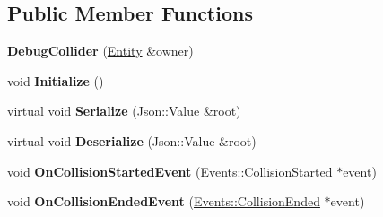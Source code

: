\subsection*{Public Member Functions}
\begin{DoxyCompactItemize}
\item 
\hypertarget{classDCEngine_1_1Components_1_1DebugCollider_a40dec5fc957f92340508b3570e513874}{{\bfseries Debug\-Collider} (\hyperlink{classDCEngine_1_1Entity}{Entity} \&owner)}\label{classDCEngine_1_1Components_1_1DebugCollider_a40dec5fc957f92340508b3570e513874}

\item 
\hypertarget{classDCEngine_1_1Components_1_1DebugCollider_ae752ba4d3b7dc2f8857536b277c9b2a2}{void {\bfseries Initialize} ()}\label{classDCEngine_1_1Components_1_1DebugCollider_ae752ba4d3b7dc2f8857536b277c9b2a2}

\item 
\hypertarget{classDCEngine_1_1Components_1_1DebugCollider_a0f5a33e7a1012393e58073505e47fdb4}{virtual void {\bfseries Serialize} (Json\-::\-Value \&root)}\label{classDCEngine_1_1Components_1_1DebugCollider_a0f5a33e7a1012393e58073505e47fdb4}

\item 
\hypertarget{classDCEngine_1_1Components_1_1DebugCollider_a6cb73edd53aa5fb98841aecf4f7f3b61}{virtual void {\bfseries Deserialize} (Json\-::\-Value \&root)}\label{classDCEngine_1_1Components_1_1DebugCollider_a6cb73edd53aa5fb98841aecf4f7f3b61}

\item 
\hypertarget{classDCEngine_1_1Components_1_1DebugCollider_af31ccceeac52e79a796fdb594336bd58}{void {\bfseries On\-Collision\-Started\-Event} (\hyperlink{classDCEngine_1_1Events_1_1CollisionStarted}{Events\-::\-Collision\-Started} $\ast$event)}\label{classDCEngine_1_1Components_1_1DebugCollider_af31ccceeac52e79a796fdb594336bd58}

\item 
\hypertarget{classDCEngine_1_1Components_1_1DebugCollider_acc41c399395c2241836bfa3d66e72e59}{void {\bfseries On\-Collision\-Ended\-Event} (\hyperlink{classDCEngine_1_1Events_1_1CollisionEnded}{Events\-::\-Collision\-Ended} $\ast$event)}\label{classDCEngine_1_1Components_1_1DebugCollider_acc41c399395c2241836bfa3d66e72e59}

\end{DoxyCompactItemize}
